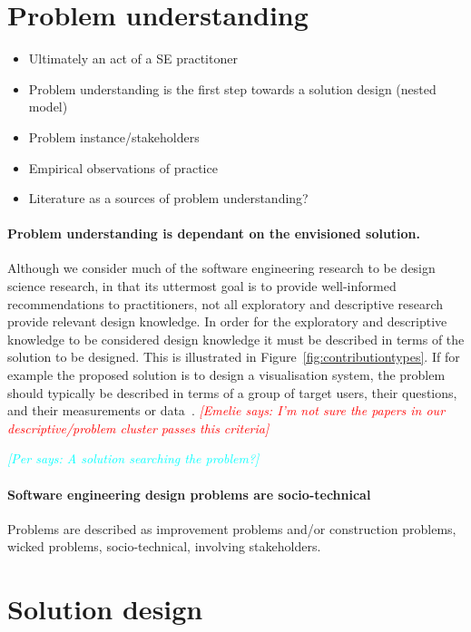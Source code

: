 \documentclass[graybox]{svmult}
\newcommand{\emelie}[1]{\textcolor{red}{{\it [Emelie says: #1]}}}
\newcommand{\per}[1]{\textcolor{cyan}{{\it [Per says: #1]}}}
\newcommand{\emelie}[1]{}
\newcommand{\per}[1]{}
\begin{document}
\section{Problem understanding}
\begin{itemize}
\item Ultimately an act of a SE practitoner
\item Problem understanding is the first step towards a solution design (nested model)
\item Problem instance/stakeholders 
\item Empirical observations of practice
\item Literature as a sources of problem understanding?
\end{itemize}


\paragraph{Problem understanding is dependant on the envisioned solution.}Although we consider much of the software engineering research to be design science research, in that its uttermost goal is to provide well-informed recommendations to practitioners, not all exploratory and descriptive research provide relevant design knowledge. In order for the exploratory and descriptive knowledge to be considered design knowledge it must be described in terms of the solution to be designed. This is illustrated in Figure~\ref{fig:contributiontypes}. If for example the proposed solution is to design a visualisation system, the problem should typically be described in terms of a group of target users, their questions, and their measurements or data~\cite{meyer_nested_2015}. \emelie{I'm not sure the papers in our descriptive/problem cluster passes this criteria}

\per{A solution searching the problem?}

\paragraph{Software engineering design problems are socio-technical}
Problems are described as improvement problems and/or construction problems, wicked problems, socio-technical, involving stakeholders. 



\section{Solution design}
\end{document}
